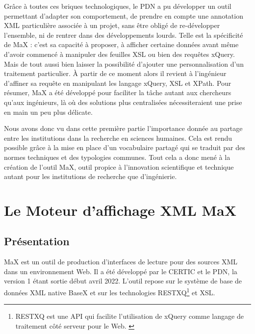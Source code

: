 \documentclass[a4paper,12pt,twoside]{book}
\begin{document}
    
    Grâce à toutes ces briques technologiques, le \acrshort{PDN} a pu développer un outil permettant d'adapter son comportement, de prendre en compte une annotation \acrshort{XML} particulière associée à un projet, sans être obligé de re-développer l'ensemble, ni de rentrer dans des développements lourds. Telle est la spécificité de MaX : c'est sa capacité à proposer, à afficher certaine données avant même d'avoir commencé à manipuler des feuilles \acrshort{XSL} ou bien des requêtes xQuery. Mais de tout aussi bien laisser la possibilité d'ajouter une personnalisation d'un traitement particulier. À partir de ce moment alors il revient à l'ingénieur d'affiner sa requête en manipulant les langage xQuery, \acrshort{XSL} et XPath. Pour résumer, MaX a été développé pour faciliter la tâche autant aux chercheurs qu'aux ingénieurs, là où des solutions plus centralisées nécessiteraient une prise en main un peu plus délicate.
    
    
    Nous avons donc vu dans cette première partie l'importance donnée au partage entre les institutions dans la recherche en sciences humaines. Cela est rendu possible grâce à la mise en place d'un vocabulaire partagé qui se traduit par des normes techniques et des typologies communes. Tout cela a donc mené à la création de l'outil MaX, outil propice à l'innovation scientifique et technique autant pour les institutions de recherche que d'ingénierie.
    
\part{Le Moteur d'affichage XML MaX}
    
\chapter{Présentation}
MaX est un outil de production d'interfaces de lecture pour des sources \acrshort{XML} dans un environnement Web. Il a été développé par le \acrfull{CERTIC} et le \acrshort{PDN}, la version 1 étant sortie début avril 2022. L'outil repose sur le système de base de données \acrshort{XML} native BaseX et sur les technologies RESTXQ\footnote{RESTXQ est une API qui facilite l'utilisation de xQuery comme langage de traitement côté serveur pour le Web. \cite{xquery}} et XSL.
\end{document}

